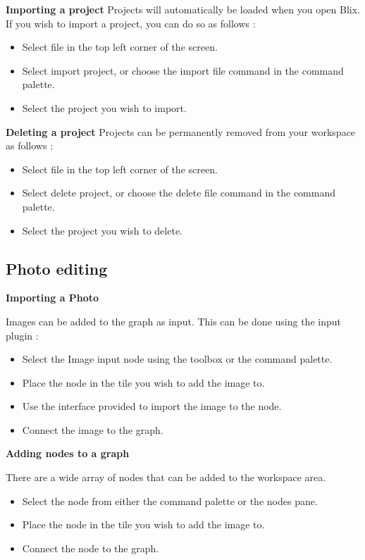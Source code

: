 \documentclass[11pt,a4paper]{article}
\begin{document}
\textbf{Importing a project}
Projects will automatically be loaded when you open Blix. If you wish to import a project, you can do so as follows : 

\begin{itemize}
  \item[\textbullet] Select file in the top left corner of the screen.
  \item[\textbullet] Select import project, or choose the import file command in the command palette.
  \item[\textbullet] Select the project you wish to import.
\end{itemize}

\textbf{Deleting a project}
Projects can be permanently removed from your workspace as follows : 
\begin{itemize}
  \item[\textbullet] Select file in the top left corner of the screen.
  \item[\textbullet] Select delete project, or choose the delete file command in the command palette.
  \item[\textbullet] Select the project you wish to delete.
\end{itemize}

\subsection*{Photo editing}

\textbf{Importing a Photo}

Images can be added to the graph as input. This can be done using the input plugin : 
\begin{itemize}
  \item[\textbullet] Select the Image input node using the toolbox or the command palette.
  \item[\textbullet] Place the node in the tile you wish to add the image to.
  \item[\textbullet] Use the interface provided to import the image to the node.
  \item[\textbullet] Connect the image to the graph.
\end{itemize}

\textbf{Adding nodes to a graph}

There are a wide array of nodes that can be added to the workspace area.
\begin{itemize}
  \item[\textbullet] Select the node from either the command palette or the nodes pane.
  \item[\textbullet] Place the node in the tile you wish to add the image to.
  \item[\textbullet] Connect the node to the graph.
\end{itemize}
\end{document}
